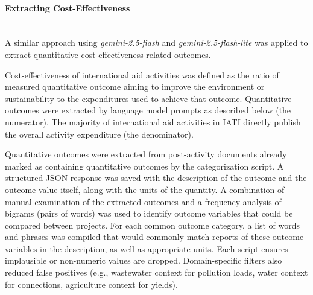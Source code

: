 \documentclass[12pt,a4paper]{article}
\newcommand{\subsubsubsection}[1]{\paragraph{#1}\mbox{}\\}
\begin{document}
\FloatBarrier
\subsubsubsection{Extracting Cost-Effectiveness}
A similar approach using \emph{gemini-2.5-flash} and \emph{gemini-2.5-flash-lite} was applied to extract quantitative cost-effectiveness-related outcomes.

Cost-effectiveness of international aid activities was defined as the ratio of measured quantitative outcome aiming to improve the environment or sustainability to the expenditures used to achieve that outcome. Quantitative outcomes were extracted by language model prompts as described below (the numerator). The majority of international aid activities in IATI directly publish the overall activity expenditure (the denominator). 

Quantitative outcomes were extracted from post-activity documents already marked as containing quantitative outcomes by the categorization script. A structured JSON response was saved with the description of the outcome and the outcome value itself, along with the units of the quantity. A combination of manual examination of the extracted outcomes and a frequency analysis of bigrams (pairs of words) was used to identify outcome variables that could be compared between projects. For each common outcome category, a list of words and phrases was compiled that would commonly match reports of these outcome variables in the description, as well as appropriate units. Each script ensures implausible or non-numeric values are dropped. Domain-specific filters also reduced false positives (e.g., wastewater context for pollution loads, water context for connections, agriculture context for yields).
\end{document}
